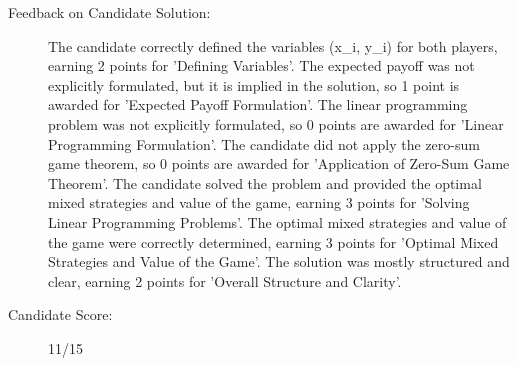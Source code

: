 \documentclass{article}%
\begin{document}
\begin{description}
\item[Feedback on Candidate Solution: ]%
The candidate correctly defined the variables (x\_i, y\_i) for both players, earning 2 points for 'Defining Variables'. The expected payoff was not explicitly formulated, but it is implied in the solution, so 1 point is awarded for 'Expected Payoff Formulation'. The linear programming problem was not explicitly formulated, so 0 points are awarded for 'Linear Programming Formulation'. The candidate did not apply the zero{-}sum game theorem, so 0 points are awarded for 'Application of Zero{-}Sum Game Theorem'. The candidate solved the problem and provided the optimal mixed strategies and value of the game, earning 3 points for 'Solving Linear Programming Problems'. The optimal mixed strategies and value of the game were correctly determined, earning 3 points for 'Optimal Mixed Strategies and Value of the Game'. The solution was mostly structured and clear, earning 2 points for 'Overall Structure and Clarity'.%
\item[Candidate Score: ]%
11/15%
\end{description}

%
\end{document}

